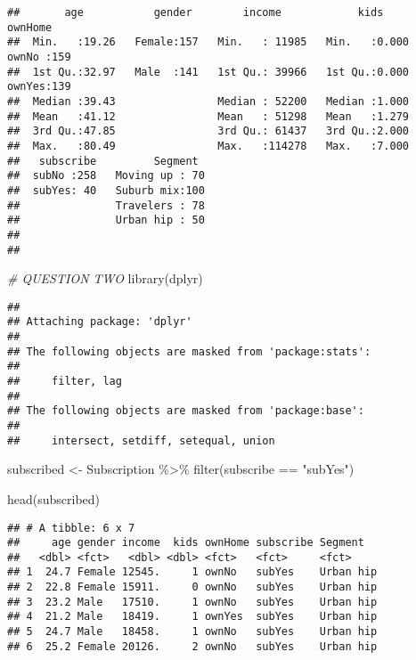 \documentclass[
]{article}
\newenvironment{Shaded}{\begin{snugshade}}{\end{snugshade}}
\newcommand{\CommentTok}[1]{\textcolor[rgb]{0.56,0.35,0.01}{\textit{#1}}}
\newcommand{\FunctionTok}[1]{\textcolor[rgb]{0.00,0.00,0.00}{#1}}
\newcommand{\NormalTok}[1]{#1}
\newcommand{\OtherTok}[1]{\textcolor[rgb]{0.56,0.35,0.01}{#1}}
\newcommand{\SpecialCharTok}[1]{\textcolor[rgb]{0.00,0.00,0.00}{#1}}
\newcommand{\StringTok}[1]{\textcolor[rgb]{0.31,0.60,0.02}{#1}}
\begin{document}
\begin{verbatim}
##       age           gender        income            kids         ownHome   
##  Min.   :19.26   Female:157   Min.   : 11985   Min.   :0.000   ownNo :159  
##  1st Qu.:32.97   Male  :141   1st Qu.: 39966   1st Qu.:0.000   ownYes:139  
##  Median :39.43                Median : 52200   Median :1.000               
##  Mean   :41.12                Mean   : 51298   Mean   :1.279               
##  3rd Qu.:47.85                3rd Qu.: 61437   3rd Qu.:2.000               
##  Max.   :80.49                Max.   :114278   Max.   :7.000               
##   subscribe         Segment   
##  subNo :258   Moving up : 70  
##  subYes: 40   Suburb mix:100  
##               Travelers : 78  
##               Urban hip : 50  
##                               
## 
\end{verbatim}

\begin{Shaded}
\begin{Highlighting}[]
\CommentTok{\# QUESTION TWO}
\FunctionTok{library}\NormalTok{(dplyr)}
\end{Highlighting}
\end{Shaded}

\begin{verbatim}
## 
## Attaching package: 'dplyr'
## 
## The following objects are masked from 'package:stats':
## 
##     filter, lag
## 
## The following objects are masked from 'package:base':
## 
##     intersect, setdiff, setequal, union
\end{verbatim}

\begin{Shaded}
\begin{Highlighting}[]
\NormalTok{subscribed }\OtherTok{\textless{}{-}}\NormalTok{ Subscription }\SpecialCharTok{\%\textgreater{}\%}
  \FunctionTok{filter}\NormalTok{(subscribe }\SpecialCharTok{==} \StringTok{"subYes"}\NormalTok{)}

\FunctionTok{head}\NormalTok{(subscribed)}
\end{Highlighting}
\end{Shaded}

\begin{verbatim}
## # A tibble: 6 x 7
##     age gender income  kids ownHome subscribe Segment  
##   <dbl> <fct>   <dbl> <dbl> <fct>   <fct>     <fct>    
## 1  24.7 Female 12545.     1 ownNo   subYes    Urban hip
## 2  22.8 Female 15911.     0 ownNo   subYes    Urban hip
## 3  23.2 Male   17510.     1 ownNo   subYes    Urban hip
## 4  21.2 Male   18419.     1 ownYes  subYes    Urban hip
## 5  24.7 Male   18458.     1 ownNo   subYes    Urban hip
## 6  25.2 Female 20126.     2 ownNo   subYes    Urban hip
\end{verbatim}
\end{document}
